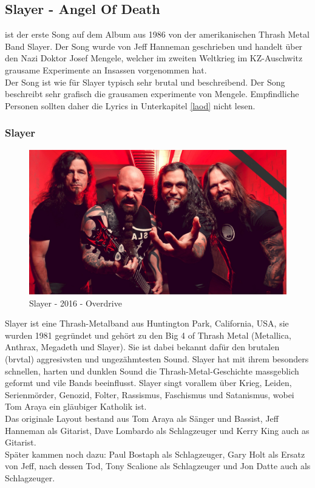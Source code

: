 \documentclass[twocolumn,10pt]{article}
\begin{document}
		\subsection{Slayer - Angel Of Death}
			 ist der erste Song auf dem Album  aus 1986 von der amerikanischen Thrash Metal Band Slayer. Der Song wurde von Jeff Hanneman geschrieben und handelt über den Nazi Doktor Josef Mengele, welcher im zweiten Weltkrieg im KZ-Auschwitz grausame Experimente an Insassen vorgenommen hat.\\
			Der Song ist wie für Slayer typisch sehr brutal und beschreibend. Der Song beschreibt sehr grafisch die grausamen experimente von Mengele. Empfindliche Personen sollten daher die Lyrics in Unterkapitel \autoref{laod} nicht lesen.
			\subsubsection{Slayer}
			\begin{figure}[H]
				\includegraphics[width=\linewidth]{slayer-2016}
				\caption{Slayer - 2016 - Overdrive\cite{overdrive_2018}}
			\end{figure}
			Slayer ist eine Thrash-Metalband aus Huntington Park, California, USA, sie wurden 1981 gegründet und gehört zu den Big 4 of Thrash Metal (Metallica, Anthrax, Megadeth und Slayer). Sie ist dabei bekannt dafür den brutalen (brvtal) aggresivsten und ungezähmtesten Sound. Slayer hat mit ihrem besonders schnellen, harten und dunklen Sound die Thrash-Metal-Geschichte massgeblich geformt und vile Bands beeinflusst. Slayer singt vorallem über Krieg, Leiden, Serienmörder, Genozid, Folter, Rassismus, Faschismus und Satanismus, wobei Tom Araya ein gläubiger Katholik ist.\\
			Das originale Layout bestand aus Tom Araya als Sänger und Bassist, Jeff Hanneman als Gitarist, Dave Lombardo als Schlagzeuger und Kerry King auch as Gitarist.\\
			Später kammen noch dazu: Paul Bostaph als Schlagzeuger, Gary Holt als Ersatz von Jeff, nach dessen Tod, Tony Scalione als Schlagzeuger und Jon Datte auch als Schlagzeuger.\cite{slayerInterview}\\
			\clearpage
\end{document}
